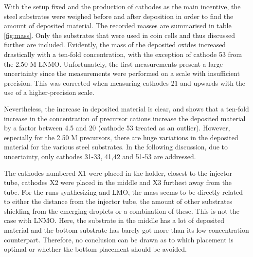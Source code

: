 \documentclass[Main/main.tex]{subfiles}
\begin{document}
With the setup fixed and the production of cathodes as the main incentive, the steel substrates were weighed before and after deposition in order to find the amount of deposited material. The recorded masses are summarised in table \ref{fig:mass}. Only the substrates that were used in coin cells and thus discussed further are included. Evidently, the mass of the deposited oxides increased drastically with a ten-fold concentration, with the exception of cathode 53 from the 2.50 M LNMO. Unfortunately, the first measurements present a large uncertainty since the measurements were performed on a scale with insufficient precision. This was corrected when measuring cathodes 21 and upwards with the use of a higher-precision scale.

Nevertheless, the increase in deposited material is clear, and shows that a ten-fold increase in the concentration of precursor cations increase the deposited material by a factor between 4.5 and 20 (cathode 53 treated as an outlier). However, especially for the 2.50 M precursors, there are huge variations in the deposited material for the various steel substrates. In the following discussion, due to uncertainty, only cathodes 31-33, 41,42 and 51-53 are addressed. 

The cathodes numbered X1 were placed in the holder, closest to the injector tube, cathodes X2 were placed in the middle and X3 furthest away from the tube. For the runs synthesizing  and LMO, the mass seems to be directly related to either the distance from the injector tube, the amount of other substrates shielding from the emerging droplets or a combination of these. This is not the case with LNMO. Here, the substrate in the middle has a lot of deposited material and the bottom substrate has barely got more than its low-concentration counterpart. Therefore, no conclusion can be drawn as to which placement is optimal or whether the bottom placement should be avoided. 
\end{document}
